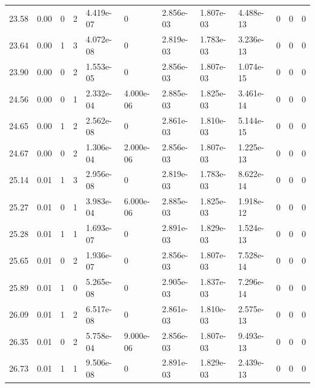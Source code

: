 \documentclass[preview]{standalone}
\begin{document}
{{{\begin{tabular}{L{1.2cm}C{1.2cm} C{0.3cm}C{0.5cm} C{1.4cm}C{1.4cm} C{1.4cm}C{1.4cm} C{1.6cm}C{1.6cm} C{1.6cm}C{1.6cm}}
  23.58  &  0.00  & 0     &  2 &  4.419e-07  & 0  &  2.856e-03&   1.807e-03& 4.488e-13 & 0   &  0 & 0  \\ 
  23.64  &  0.00  & 1     &  3 &  4.072e-08  & 0  &  2.819e-03&   1.783e-03& 3.236e-13 & 0   &  0 & 0  \\ 
  23.90  &  0.00  & 0     &  2 &  1.553e-05  & 0  &  2.856e-03&   1.807e-03& 1.074e-15 & 0   &  0 & 0  \\ 
  24.56  &  0.00  & 0     &  1 &  2.332e-04  & 4.000e-06  &  2.885e-03&   1.825e-03& 3.461e-14 & 0   &  0 & 0  \\ 
  24.65  &  0.00  & 1     &  2 &  2.562e-08  & 0  &  2.861e-03&   1.810e-03& 5.144e-15 & 0   &  0 & 0  \\ 
  24.67  &  0.00  & 0     &  2 &  1.306e-04  & 2.000e-06  &  2.856e-03&   1.807e-03& 1.225e-13 & 0   &  0 & 0  \\ 
  25.14  &  0.01  & 1     &  3 &  2.956e-08  & 0  &  2.819e-03&   1.783e-03& 8.622e-14 & 0   &  0 & 0  \\ 
  25.27  &  0.01  & 0     &  1 &  3.983e-04  & 6.000e-06  &  2.885e-03&   1.825e-03& 1.918e-12 & 0   &  0 & 0  \\ 
  25.28  &  0.01  & 1     &  1 &  1.693e-07  & 0  &  2.891e-03&   1.829e-03& 1.524e-13 & 0   &  0 & 0  \\ 
  25.65  &  0.01  & 0     &  2 &  1.936e-07  & 0  &  2.856e-03&   1.807e-03& 7.528e-14 & 0   &  0 & 0  \\ 
  25.89  &  0.01  & 1     &  0 &  5.265e-08  & 0  &  2.905e-03&   1.837e-03& 7.296e-14 & 0   &  0 & 0  \\ 
  26.09  &  0.01  & 1     &  2 &  6.517e-08  & 0  &  2.861e-03&   1.810e-03& 2.575e-13 & 0   &  0 & 0  \\ 
  26.35  &  0.01  & 0     &  2 &  5.758e-04  & 9.000e-06  &  2.856e-03&   1.807e-03& 9.493e-13 & 0   &  0 & 0  \\ 
  26.73  &  0.01  & 1     &  1 &  9.506e-08  & 0  &  2.891e-03&   1.829e-03& 2.439e-13 & 0   &  0 & 0  \\ 
\hline 
\end{tabular} 

}}}
\end{document}
